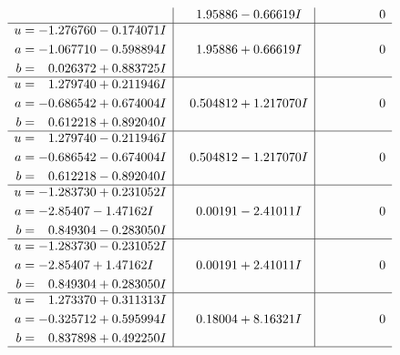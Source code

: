 \documentclass[1p]{elsarticle_modified}
\theoremstyle{definition}
\begin{document}
$$\begin{array}{c|c|c}
 & \phantom{-}1.95886 - 0.66619 I & \phantom{-0.000000 } 0 \\ \hline\begin{aligned}
u &= -1.276760 - 0.174071 I \\
a &= -1.067710 - 0.598894 I \\
b &= \phantom{-}0.026372 + 0.883725 I\end{aligned}
 & \phantom{-}1.95886 + 0.66619 I & \phantom{-0.000000 } 0 \\ \hline\begin{aligned}
u &= \phantom{-}1.279740 + 0.211946 I \\
a &= -0.686542 + 0.674004 I \\
b &= \phantom{-}0.612218 + 0.892040 I\end{aligned}
 & \phantom{-}0.504812 + 1.217070 I & \phantom{-0.000000 } 0 \\ \hline\begin{aligned}
u &= \phantom{-}1.279740 - 0.211946 I \\
a &= -0.686542 - 0.674004 I \\
b &= \phantom{-}0.612218 - 0.892040 I\end{aligned}
 & \phantom{-}0.504812 - 1.217070 I & \phantom{-0.000000 } 0 \\ \hline\begin{aligned}
u &= -1.283730 + 0.231052 I \\
a &= -2.85407 - 1.47162 I \\
b &= \phantom{-}0.849304 - 0.283050 I\end{aligned}
 & \phantom{-}0.00191 - 2.41011 I & \phantom{-0.000000 } 0 \\ \hline\begin{aligned}
u &= -1.283730 - 0.231052 I \\
a &= -2.85407 + 1.47162 I \\
b &= \phantom{-}0.849304 + 0.283050 I\end{aligned}
 & \phantom{-}0.00191 + 2.41011 I & \phantom{-0.000000 } 0 \\ \hline\begin{aligned}
u &= \phantom{-}1.273370 + 0.311313 I \\
a &= -0.325712 + 0.595994 I \\
b &= \phantom{-}0.837898 + 0.492250 I\end{aligned}
 & \phantom{-}0.18004 + 8.16321 I & \phantom{-0.000000 } 0\\
 \hline 
 \end{array}$$\newpage$$\begin{array}{c|c|c}  

\end{array}$$
\end{document}
